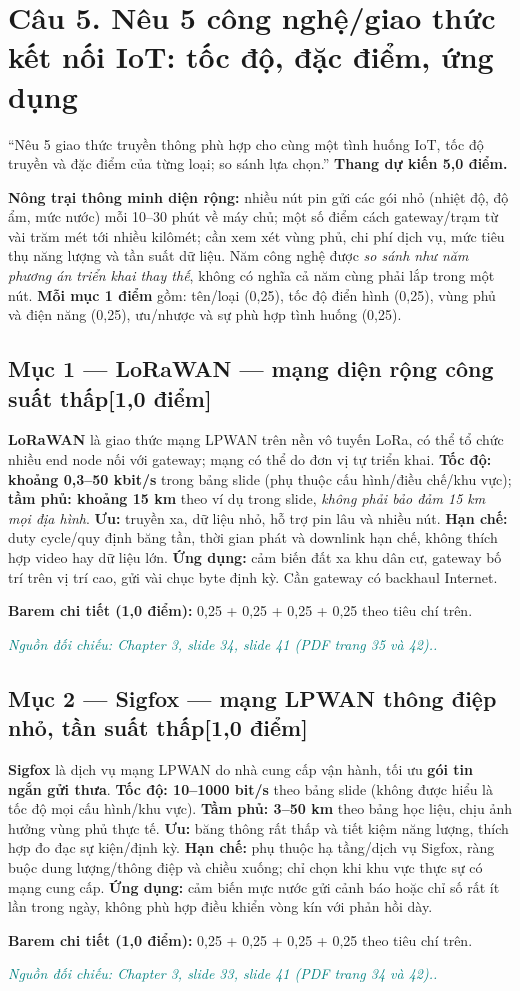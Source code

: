 \documentclass[11pt,a4paper]{article}
\newcommand{\pointpart}[2]{\subsection*{Mục #1 --- #2\hfill\normalsize\color{teal}[1,0 điểm]}}
\newcommand{\src}[1]{\par\noindent\textcolor{teal}{\footnotesize\textit{Nguồn đối chiếu: #1.}}\par}
\newcommand{\scoring}[1]{\par\noindent\textbf{Barem chi tiết (1,0 điểm):} #1\par}
\newcommand{\kw}[1]{\textbf{#1}}
\begin{document}
\clearpage
\section{Câu 5. Nêu 5 công nghệ/giao thức kết nối IoT: tốc độ, đặc điểm, ứng dụng}
\begin{questionbox}
``Nêu 5 giao thức truyền thông phù hợp cho cùng một tình huống IoT, tốc độ truyền và đặc điểm của từng loại; so sánh lựa chọn.'' \textbf{Thang dự kiến 5,0 điểm.}
\end{questionbox}
\begin{notesbox}[title={Tình huống thống nhất cho cả năm phương án}]
\kw{Nông trại thông minh diện rộng:} nhiều nút pin gửi các gói nhỏ (nhiệt độ, độ ẩm, mức nước) mỗi 10--30 phút về máy chủ; một số điểm cách gateway/trạm từ vài trăm mét tới nhiều kilômét; cần xem xét vùng phủ, chi phí dịch vụ, mức tiêu thụ năng lượng và tần suất dữ liệu. Năm công nghệ được \emph{so sánh như năm phương án triển khai thay thế}, không có nghĩa cả năm cùng phải lắp trong một nút. \kw{Mỗi mục 1 điểm} gồm: tên/loại (0,25), tốc độ điển hình (0,25), vùng phủ và điện năng (0,25), ưu/nhược và sự phù hợp tình huống (0,25).
\end{notesbox}
\pointpart{1}{LoRaWAN --- mạng diện rộng công suất thấp}
\kw{LoRaWAN} là giao thức mạng LPWAN trên nền vô tuyến LoRa, có thể tổ chức nhiều end node nối với gateway; mạng có thể do đơn vị tự triển khai. \kw{Tốc độ: khoảng 0,3--50 kbit/s} trong bảng slide (phụ thuộc cấu hình/điều chế/khu vực); \kw{tầm phủ: khoảng 15 km} theo ví dụ trong slide, \emph{không phải bảo đảm 15 km mọi địa hình}. \kw{Ưu:} truyền xa, dữ liệu nhỏ, hỗ trợ pin lâu và nhiều nút. \kw{Hạn chế:} duty cycle/quy định băng tần, thời gian phát và downlink hạn chế, không thích hợp video hay dữ liệu lớn. \kw{Ứng dụng:} cảm biến đất xa khu dân cư, gateway bố trí trên vị trí cao, gửi vài chục byte định kỳ. Cần gateway có backhaul Internet.
\scoring{0,25 + 0,25 + 0,25 + 0,25 theo tiêu chí trên.}
\src{Chapter 3, slide 34, slide 41 (PDF trang 35 và 42).}

\pointpart{2}{Sigfox --- mạng LPWAN thông điệp nhỏ, tần suất thấp}
\kw{Sigfox} là dịch vụ mạng LPWAN do nhà cung cấp vận hành, tối ưu \kw{gói tin ngắn gửi thưa}. \kw{Tốc độ: 10--1000 bit/s} theo bảng slide (không được hiểu là tốc độ mọi cấu hình/khu vực). \kw{Tầm phủ: 3--50 km} theo bảng học liệu, chịu ảnh hưởng vùng phủ thực tế. \kw{Ưu:} băng thông rất thấp và tiết kiệm năng lượng, thích hợp đo đạc sự kiện/định kỳ. \kw{Hạn chế:} phụ thuộc hạ tầng/dịch vụ Sigfox, ràng buộc dung lượng/thông điệp và chiều xuống; chỉ chọn khi khu vực thực sự có mạng cung cấp. \kw{Ứng dụng:} cảm biến mực nước gửi cảnh báo hoặc chỉ số rất ít lần trong ngày, không phù hợp điều khiển vòng kín với phản hồi dày.
\scoring{0,25 + 0,25 + 0,25 + 0,25 theo tiêu chí trên.}
\src{Chapter 3, slide 33, slide 41 (PDF trang 34 và 42).}
\end{document}
